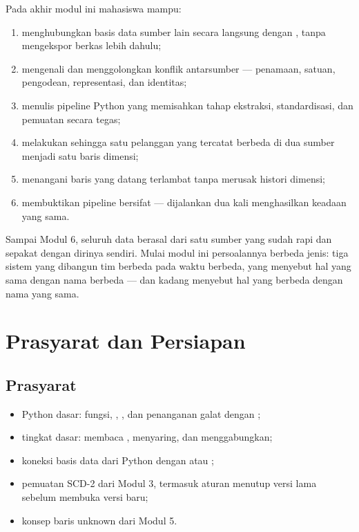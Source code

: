 \begin{capaian}
Pada akhir modul ini mahasiswa mampu:
\begin{enumerate}[leftmargin=1.4em]
  \item menghubungkan basis data sumber lain secara langsung dengan
        , tanpa mengekspor berkas lebih dahulu;
  \item mengenali dan menggolongkan konflik antarsumber --- penamaan, satuan,
        pengodean, representasi, dan identitas;
  \item menulis pipeline Python yang memisahkan tahap ekstraksi,
        standardisasi, dan pemuatan secara tegas;
  \item melakukan  sehingga satu pelanggan yang
        tercatat berbeda di dua sumber menjadi satu baris dimensi;
  \item menangani baris yang datang terlambat tanpa merusak histori dimensi;
  \item membuktikan pipeline bersifat  --- dijalankan dua
        kali menghasilkan keadaan yang sama.
\end{enumerate}
\end{capaian}

Sampai Modul 6, seluruh data berasal dari satu sumber yang sudah rapi dan
sepakat dengan dirinya sendiri. Mulai modul ini persoalannya berbeda jenis:
tiga sistem yang dibangun tim berbeda pada waktu berbeda, yang menyebut hal
yang sama dengan nama berbeda --- dan kadang menyebut hal yang berbeda dengan
nama yang sama.

\section{Prasyarat dan Persiapan}

\subsection{Prasyarat}

\begin{itemize}
  \item Python dasar: fungsi, , ,
        dan penanganan galat dengan ;
  \item {} tingkat dasar: membaca ,
        menyaring, dan menggabungkan;
  \item koneksi basis data dari Python dengan  atau
        ;
  \item pemuatan SCD-2 dari Modul 3, termasuk aturan menutup versi lama sebelum
        membuka versi baru;
  \item konsep baris unknown dari Modul 5.
\end{itemize}

